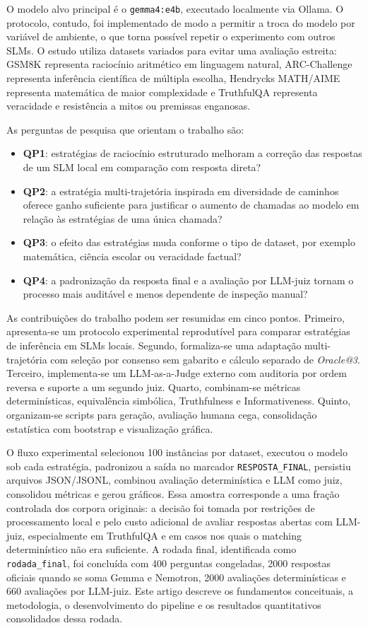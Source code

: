 \documentclass[12pt]{article}
\makeatletter
\newcommand{\oracle}{\mbox{\textit{Oracle@3}}}
\makeatother
\begin{document}
O modelo alvo principal é o \texttt{gemma4:e4b}, executado localmente via Ollama. O protocolo, contudo, foi implementado de modo a permitir a troca do modelo por variável de ambiente, o que torna possível repetir o experimento com outros SLMs. O estudo utiliza datasets variados para evitar uma avaliação estreita: GSM8K representa raciocínio aritmético em linguagem natural, ARC-Challenge representa inferência científica de múltipla escolha, Hendrycks MATH/AIME representa matemática de maior complexidade e TruthfulQA representa veracidade e resistência a mitos ou premissas enganosas.

As perguntas de pesquisa que orientam o trabalho são:

\begin{itemize}
\item \textbf{QP1}: estratégias de raciocínio estruturado melhoram a correção das respostas de um SLM local em comparação com resposta direta?
\item \textbf{QP2}: a estratégia multi-trajetória inspirada em diversidade de caminhos oferece ganho suficiente para justificar o aumento de chamadas ao modelo em relação às estratégias de uma única chamada?
\item \textbf{QP3}: o efeito das estratégias muda conforme o tipo de dataset, por exemplo matemática, ciência escolar ou veracidade factual?
\item \textbf{QP4}: a padronização da resposta final e a avaliação por LLM-juiz tornam o processo mais auditável e menos dependente de inspeção manual?
\end{itemize}

As contribuições do trabalho podem ser resumidas em cinco pontos. Primeiro, apresenta-se um protocolo experimental reprodutível para comparar estratégias de inferência em SLMs locais. Segundo, formaliza-se uma adaptação multi-trajetória com seleção por consenso sem gabarito e cálculo separado de \oracle{}. Terceiro, implementa-se um LLM-as-a-Judge externo com auditoria por ordem reversa e suporte a um segundo juiz. Quarto, combinam-se métricas determinísticas, equivalência simbólica, Truthfulness e Informativeness. Quinto, organizam-se scripts para geração, avaliação humana cega, consolidação estatística com bootstrap e visualização gráfica.

O fluxo experimental selecionou 100 instâncias por dataset, executou o modelo sob cada estratégia, padronizou a saída no marcador \texttt{RESPOSTA\_FINAL}, persistiu arquivos JSON/JSONL, combinou avaliação determinística e LLM como juiz, consolidou métricas e gerou gráficos. Essa amostra corresponde a uma fração controlada dos corpora originais: a decisão foi tomada por restrições de processamento local e pelo custo adicional de avaliar respostas abertas com LLM-juiz, especialmente em TruthfulQA e em casos nos quais o matching determinístico não era suficiente. A rodada final, identificada como \texttt{rodada\_final}, foi concluída com 400 perguntas congeladas, 2000 respostas oficiais quando se soma Gemma e Nemotron, 2000 avaliações determinísticas e 660 avaliações por LLM-juiz. Este artigo descreve os fundamentos conceituais, a metodologia, o desenvolvimento do pipeline e os resultados quantitativos consolidados dessa rodada.
\end{document}
